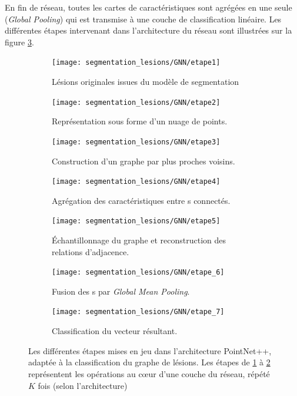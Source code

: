 En fin de réseau, toutes les cartes de caractéristiques sont agrégées en une seule (\textit{Global Pooling}) qui est transmise à une couche de classification linéaire. Les différentes étapes intervenant dans l'architecture du réseau sont illustrées sur la figure \ref{fig:PointNetLesionsDRClass}.

\renewcommand{\colSize}{0.22}
\begin{figure}[t]
	\centering
\begin{subfigure}[t]{\colSize\textwidth}
	\texttt{[image: segmentation\_lesions/GNN/etape1]}
	\caption{Lésions originales issues du modèle de segmentation}
\end{subfigure}
\begin{subfigure}[t]{\colSize\textwidth}
	\texttt{[image: segmentation\_lesions/GNN/etape2]}
	\caption{Représentation sous forme d'un nuage de points.}

\end{subfigure}
\begin{subfigure}[t]{\colSize\textwidth}
	\texttt{[image: segmentation\_lesions/GNN/etape3]}
	\caption{Construction d'un graphe par plus proches voisins.}
	\label{subfig:StepAGraphConstruction}
\end{subfigure}
\begin{subfigure}[t]{\colSize\textwidth}
	\texttt{[image: segmentation\_lesions/GNN/etape4]}
	\caption{Agrégation des caractéristiques entre \noeud s connectés.}
\end{subfigure}
\hfill
\begin{subfigure}[t]{\colSize\textwidth}
	\texttt{[image: segmentation\_lesions/GNN/etape5]}
	\caption{Échantillonnage du graphe et reconstruction des relations d'adjacence.}
	\label{subfig:StepPointSampling}
\end{subfigure}
\begin{subfigure}[t]{\colSize\textwidth}
	\texttt{[image: segmentation\_lesions/GNN/etape\_6]}
	\caption{Fusion des \noeud s par \textit{Global Mean Pooling}.}
\end{subfigure}
\begin{subfigure}[t]{\colSize\textwidth}
	\texttt{[image: segmentation\_lesions/GNN/etape\_7]}
	\caption{Classification du vecteur résultant.}
\end{subfigure}

\caption{Les différentes étapes mises en jeu dans l'architecture PointNet++, adaptée à la classification du graphe de lésions. Les étapes de \ref{subfig:StepAGraphConstruction} à \ref{subfig:StepPointSampling} représentent les opérations au c\oe ur d'une couche du réseau, répété $K$ fois (selon l'architecture)}
\label{fig:PointNetLesionsDRClass}
\end{figure}

